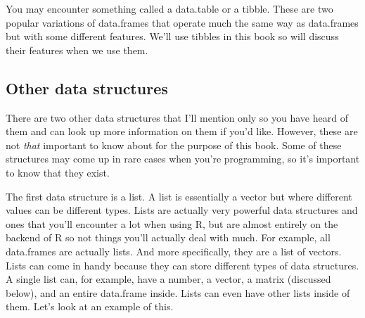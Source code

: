 \documentclass[
]{krantz}
\begin{document}
You may encounter something called a data.table or a tibble.
These are two popular variations of data.frames that operate
much the same way as data.frames but with some different
features. We'll use tibbles in this book so will discuss
their features when we use them.

\hypertarget{other-data-structures}{%
\subsection{Other data
structures}\label{other-data-structures}}

There are two other data structures that I'll mention only
so you have heard of them and can look up more information
on them if you'd like. However, these are not \emph{that}
important to know about for the purpose of this book. Some
of these structures may come up in rare cases when you're
programming, so it's important to know that they exist.

The first data structure is a list. A list is essentially a
vector but where different values can be different types.
Lists are actually very powerful data structures and ones
that you'll encounter a lot when using R, but are almost
entirely on the backend of R so not things you'll actually
deal with much. For example, all data.frames are actually
lists. And more specifically, they are a list of vectors.
Lists can come in handy because they can store different
types of data structures. A single list can, for example,
have a number, a vector, a matrix (discussed below), and an
entire data.frame inside. Lists can even have other lists
inside of them. Let's look at an example of this.
\end{document}
